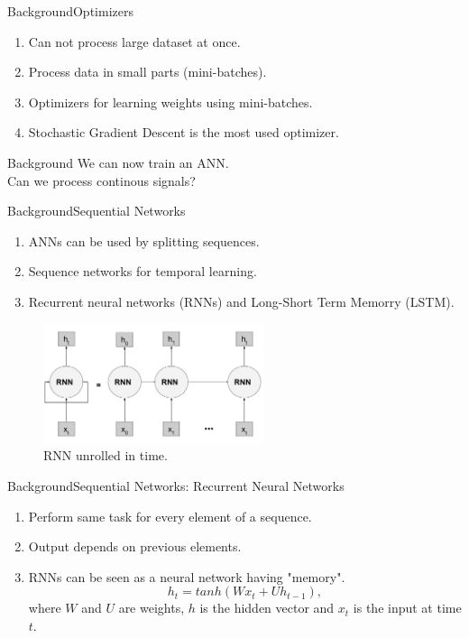 \documentclass[handout]{beamer}
\begin{document}
\begin{frame}{Background}{Optimizers}
  \begin{enumerate}
    \item Can not process large dataset at once.
    \item Process data in small parts (mini-batches).
    \item Optimizers for learning weights using mini-batches.
    \item Stochastic Gradient Descent is the most used optimizer.
  \end{enumerate}
\end{frame}

\begin{frame}{{Background}}
  \center
  \Large{\color{blue}We can now train an ANN. \\
  Can we process continous signals?}
\end{frame}

\begin{frame}{Background}{Sequential Networks}
  \begin{enumerate}
    \item ANNs can be used by splitting sequences.
    \item Sequence networks for temporal learning.
    \item Recurrent neural networks (RNNs) and Long-Short Term Memorry (LSTM).
  \end{enumerate}
  \begin{center}
    \begin{figure}
    \includegraphics[width=0.6\linewidth, height=3.5cm]{images/RNN}
    \caption{RNN unrolled in time.}
    \end{figure}
  \end{center}
\end{frame}

\begin{frame}{Background}{Sequential Networks: Recurrent Neural Networks}
  \begin{enumerate}
    \item Perform same task for every element of a sequence.
    \item Output depends on previous elements.
    \item RNNs can be seen as a neural network having "memory".
    \begin{equation}
        h_t = tanh(Wx_t+Uh_{t-1}),
    \end{equation}
    where $W$ and $U$ are weights, $h$ is the hidden vector and $x_t$ is the input at time $t$.
  \end{enumerate}

\end{frame}
\end{document}
